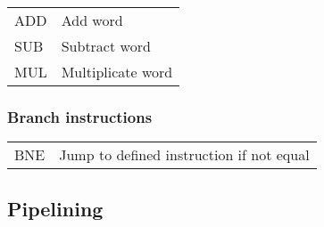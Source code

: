 \documentclass{report}
\begin{document}
\begin{tabular}{@{}ll@{}}
    ADD         & Add word                                              \\
    SUB         & Subtract word                                         \\
    MUL         & Multiplicate word                                     \\
\end{tabular}


\subsubsection{Branch instructions}

\begin{tabular}{@{}ll@{}}
    BNE         & Jump to defined instruction if not equal
\end{tabular}

\subsection{Pipelining}
\end{document}
